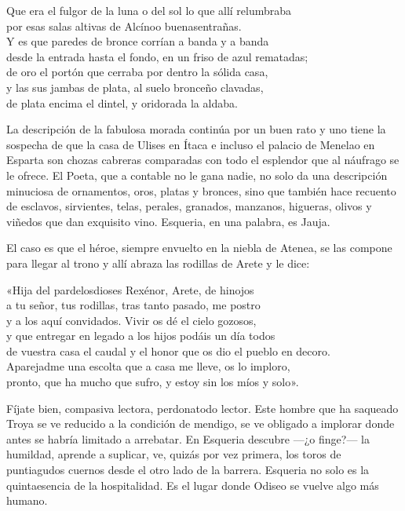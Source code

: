 \begin{versocita}
Que era el fulgor de la luna o del sol lo que allí relumbraba\\
por esas salas altivas de Alcínoo buenasentrañas.\\
Y es que paredes de bronce corrían a banda y a banda\\
desde la entrada hasta el fondo, en un friso de azul rematadas;\\
de oro el portón que cerraba por dentro la sólida casa,\\
y las sus jambas de plata, al suelo bronceño clavadas,\\
de plata encima el dintel, y oridorada la aldaba.
\end{versocita}

La descripción de la fabulosa morada continúa por un buen rato y uno tiene la sospecha de que la casa de Ulises en Ítaca e incluso el palacio de Menelao en Esparta son chozas cabreras comparadas con todo el esplendor que al náufrago se le ofrece. El Poeta, que a contable no le gana nadie, no solo da una descripción minuciosa de ornamentos, oros, platas y bronces, sino que también hace recuento de esclavos, sirvientes, telas, perales, granados, manzanos, higueras, olivos y viñedos que dan exquisito vino. Esqueria, en una palabra, es Jauja.

El caso es que el héroe, siempre envuelto en la niebla de Atenea, se las compone para llegar al trono y allí abraza las rodillas de Arete y le dice:

\begin{versocita}
«Hija del pardelosdioses Rexénor, Arete, de hinojos\\
a tu señor, tus rodillas, tras tanto pasado, me postro\\
y a los aquí convidados. Vivir os dé el cielo gozosos,\\
y que entregar en legado a los hijos podáis un día todos\\
de vuestra casa el caudal y el honor que os dio el pueblo en decoro.\\
Aparejadme una escolta que a casa me lleve, os lo imploro,\\
pronto, que ha mucho que sufro, y estoy sin los míos y solo».
\end{versocita}

Fíjate bien, compasiva lectora, perdonatodo lector. Este hombre que ha saqueado Troya se ve reducido a la condición de mendigo, se ve obligado a implorar donde antes se habría limitado a arrebatar. En Esqueria descubre ---¿o finge?--- la humildad, aprende a suplicar, ve, quizás por vez primera, los toros de puntiagudos cuernos desde el otro lado de la barrera. Esqueria no solo es la quintaesencia de la hospitalidad. Es el lugar donde Odiseo se vuelve algo más humano.

